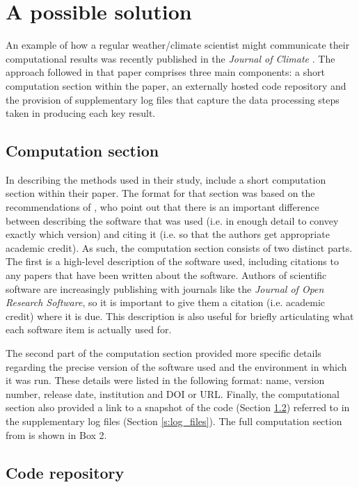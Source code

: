 \section{A possible solution}

An example of how a regular weather/climate scientist might communicate their computational results was recently published in the \textit{Journal of Climate} \citep{Irving2015}. The approach followed in that paper comprises three main components: a short computation section within the paper, an externally hosted code repository and the provision of supplementary log files that capture the data processing steps taken in producing each key result. 

\subsection{Computation section}

In describing the methods used in their study, \citet{Irving2015} include a short computation section within their paper. The format for that section was based on the recommendations of \citet{Jackson2012}, who point out that there is an important difference between describing the software that was used (i.e. in enough detail to convey exactly which version) and citing it (i.e. so that the authors get appropriate academic credit). As such, the computation section consists of two distinct parts. The first is a high-level description of the software used, including citations to any papers that have been written about the software. Authors of scientific software are increasingly publishing with journals like the \textit{Journal of Open Research Software}, so it is important to give them a citation (i.e. academic credit) where it is due. This description is also useful for briefly articulating what each software item is actually used for.

The second part of the computation section provided more specific details regarding the precise version of the software used and the environment in which it was run. These details were listed in the following format: name, version number, release date, institution and DOI or URL. Finally, the computational section also provided a link to a snapshot of the code (Section \ref{s:code_repo}) referred to in the supplementary log files (Section \ref{s:log_files}). The full computation section from \citet{Irving2015} is shown in Box 2.  

\subsection{Code repository}\label{s:code_repo}

